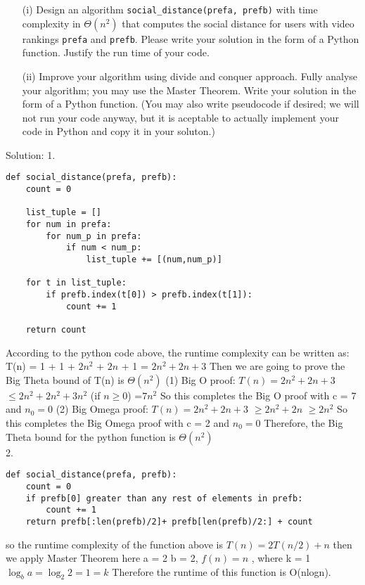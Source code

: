 \documentclass[12pt]{article}
\begin{document}
\begin{enumerate}
\item[(i)] Design an algorithm \verb|social_distance(prefa, prefb)| with time complexity in $\Theta(n^2)$ that computes the social distance for users with video rankings \verb|prefa| and \verb|prefb|. Please write your solution in the form of a Python function. Justify the run time of your code.

\item[(ii)] Improve your algorithm using divide and conquer approach. Fully analyse your algorithm; you may use the Master Theorem.
Write your solution in the form of a Python function. (You may also write pseudocode if desired; we will not run your code anyway, but it is aceptable to actually implement your code in Python and copy it in your soluton.)


\end{enumerate}
Solution:\vskip5pt
1.
\begin{verbatim}
def social_distance(prefa, prefb):
    count = 0
    
    list_tuple = []
    for num in prefa:
        for num_p in prefa:
            if num < num_p:
                list_tuple += [(num,num_p)]

    for t in list_tuple:
        if prefb.index(t[0]) > prefb.index(t[1]):
            count += 1
                       
    return count
\end{verbatim}
According to the python code above, the runtime complexity can be written as: \vskip5pt 
T(n) = 1 + 1 + $2n^2$ + $2n$ + 1 = $2n^2 + 2n + 3$\vskip5pt 
Then we are going to prove the Big Theta bound of T(n) is $\Theta(n^2)$
(1) Big O proof:
$T(n) = 2n^2 + 2n + 3$\vskip5pt
\qquad $\le 2n^2 + 2n^2 + 3n^2$ (if $n\ge 0$)\vskip5pt 
\qquad =$ 7n^2$\vskip5pt
So this completes the Big O proof with c = 7 and $n_0 = 0$\vskip5pt 
(2) Big Omega proof:
$T(n) = 2n^2 + 2n + 3$\vskip5pt
\qquad $\ge 2n^2 + 2n $\vskip5pt
\qquad $\ge 2n^2$\vskip5pt
So this completes the Big Omega proof with c = 2 and $n_0 = 0$\vskip5pt
Therefore, the Big Theta bound for the python function is $\Theta(n^2)$\\[2ex]
2. 
\begin{verbatim}
def social_distance(prefa, prefb):
    count = 0
    if prefb[0] greater than any rest of elements in prefb:
        count += 1
    return prefb[:len(prefb)/2]+ prefb[len(prefb)/2:] + count
\end{verbatim}
so the runtime complexity of the function above is $T(n) = 2T(n/2) + n$\vskip5pt
then we apply Master Theorem here\vskip5pt
a = 2 b = 2, $f(n) = n$ , where k = 1\vskip5pt
$\log_{b}a = \log_{2}2 = 1 = k$\vskip5pt
Therefore the runtime of this function is O(nlogn).
\end{document}
